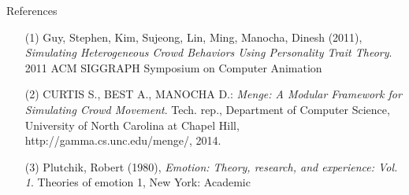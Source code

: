 \documentclass[11pt]{article}
\begin{document}
\begin{section}{References}
\begin{enumerate}
\item[(1)] Guy, Stephen, Kim, Sujeong, Lin, Ming, Manocha, Dinesh (2011), \emph{Simulating Heterogeneous Crowd Behaviors Using Personality Trait Theory}. 2011 ACM SIGGRAPH Symposium on Computer Animation
\item[(2)] CURTIS S., BEST A., MANOCHA D.: \emph{Menge: A Modular Framework for Simulating Crowd Movement}. Tech. rep., Department of Computer Science, University of North Carolina at Chapel Hill, \\http://gamma.cs.unc.edu/menge/, 2014.
\item[(3)] Plutchik, Robert (1980), \emph{Emotion: Theory, research, and experience: Vol. 1}. Theories of emotion 1, New York: Academic
\end{enumerate}
\end{section}
\end{document}
